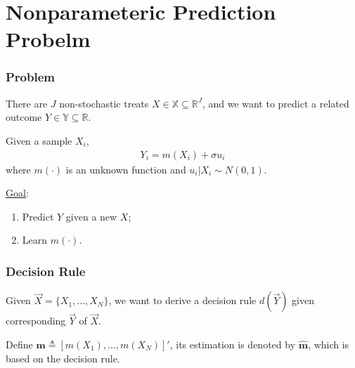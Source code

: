 \documentclass[11pt]{elegantbook}
\begin{document}
\chapter{Nonparameteric Prediction Probelm}
\subsection*{Problem}
There are $J$ non-stochastic treats $X\in \mathbb{X}\subseteq \mathbb{R}^J$, and we want to predict a related outcome $Y\in \mathbb{Y}\subseteq \mathbb{R}$.

Given a sample $X_i$,
\begin{equation}
    \begin{aligned}
        Y_i=m(X_i)+\sigma u_i
    \end{aligned}
    \nonumber
\end{equation}
where $m(\cdot)$ is an unknown function and $u_i|X_i\sim N(0,1)$.

\underline{Goal}:
\begin{enumerate}[$\circ$]
    \item Predict $Y$ given a new $X$;
    \item Learn $m(\cdot)$.
\end{enumerate}

\subsection*{Decision Rule}
Given $\vec{X}=\{X_1,...,X_N\}$, we want to derive a decision rule $d(\vec{Y})$ given corresponding $\vec{Y}$ of $\vec{X}$.

Define $\boldsymbol{m}\triangleq \left[m(X_1),...,m(X_N)\right]'$, its estimation is denoted by $\hat{\boldsymbol{m}}$, which is based on the decision rule.
\end{document}
